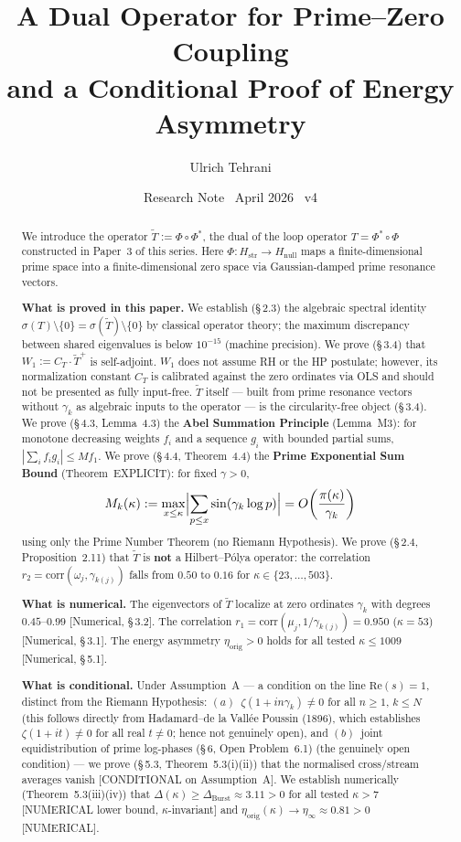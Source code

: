 \documentclass[11pt]{article}
\title{\vspace{-1.5em}\bfseries A Dual Operator for Prime--Zero Coupling\\[0.4em]
\large and a Conditional Proof of Energy Asymmetry}
\author{Ulrich Tehrani}
\date{Research Note \textperiodcentered\ April 2026 \textperiodcentered\ v4}
\newcommand{\Hstr}{H_{\mathrm{str}}}
\newcommand{\Hnull}{H_{\mathrm{null}}}
\newcommand{\etaorig}{\eta_{\mathrm{orig}}}
\newcommand{\Tt}{\widetilde{T}}
\newcommand{\CT}{C_{T}}
\newcommand{\Wone}{W_1}
\newcommand{\Dburstvar}{\Delta_{\mathrm{Burst}}}
\begin{document}
\maketitle

\begin{abstract}
We introduce the operator $\Tt := \Phi \circ \Phi^*$,
the dual of the loop operator $T = \Phi^* \circ \Phi$ constructed in Paper~3
of this series. Here $\Phi\colon\Hstr \to \Hnull$ maps a
finite-dimensional prime space into a finite-dimensional zero space via
Gaussian-damped prime resonance vectors.

\textbf{What is proved in this paper.}
We establish (\S\,2.3) the algebraic spectral identity
$\sigma(T)\setminus\{0\} = \sigma(\Tt)\setminus\{0\}$
by classical operator theory; the maximum discrepancy between shared
eigenvalues is below $10^{-15}$ (machine precision).
We prove (\S\,3.4) that $\Wone := \CT\cdot\Tt^+$ is self-adjoint.
$\Wone$ does not assume RH or the HP postulate; however, its normalization
constant $\CT$ is calibrated against the zero ordinates via OLS and should
not be presented as fully input-free.
$\Tt$ itself --- built from prime resonance vectors without $\gamma_k$ as
algebraic inputs to the operator --- is the circularity-free object (\S\,3.4).
We prove (\S\,4.3, Lemma~4.3) the \textbf{Abel Summation Principle} (Lemma~M3):
for monotone decreasing weights $f_i$ and a sequence $g_i$ with bounded
partial sums, $|\sum_i f_i g_i| \leq M f_1$.
We prove (\S\,4.4, Theorem~4.4) the \textbf{Prime Exponential Sum Bound}
(Theorem~EXPLICIT): for fixed $\gamma > 0$,
\[
M_k(\kappa) := \max_{x \leq \kappa}\Bigl|\sum_{p \leq x}\sin(\gamma_k\log p)\Bigr|
= O\!\left(\frac{\pi(\kappa)}{\gamma_k}\right)
\]
using only the Prime Number Theorem (no Riemann Hypothesis).
We prove (\S\,2.4, Proposition~2.11) that $\Tt$ is \textbf{not} a
Hilbert--P\'olya operator: the correlation
$r_2 = \mathrm{corr}(\omega_j,\gamma_{k(j)})$
falls from $0.50$ to $0.16$ for $\kappa\in\{23,\ldots,503\}$.

\textbf{What is numerical.}
The eigenvectors of $\Tt$ localize at zero ordinates $\gamma_k$
with degrees $0.45$--$0.99$ [Numerical, \S\,3.2].
The correlation $r_1 = \mathrm{corr}(\mu_j,1/\gamma_{k(j)}) = 0.950$
($\kappa=53$) [Numerical, \S\,3.1].
The energy asymmetry $\etaorig > 0$ holds for all tested $\kappa\leq 1009$
[Numerical, \S\,5.1].

\textbf{What is conditional.}
Under Assumption~A --- a condition on the line
$\mathrm{Re}(s)=1$, distinct from the Riemann Hypothesis:
$(a)$~$\zeta(1+in\gamma_k)\neq 0$ for all $n\geq 1$, $k\leq N$
(this follows directly from Hadamard--de la Vall\'ee Poussin (1896),
which establishes $\zeta(1+it)\neq 0$ for all real $t\neq 0$;
hence not genuinely open), and
$(b)$~joint equidistribution of prime log-phases (\S\,6, Open Problem~6.1)
(the genuinely open condition)
--- we prove (\S\,5.3, Theorem~5.3(i)(ii)) that the normalised cross/stream
averages vanish [CONDITIONAL on Assumption~A].
We establish numerically (Theorem~5.3(iii)(iv)) that
$\Delta(\kappa)\geq\Dburstvar\approx 3.11 > 0$ for all tested $\kappa > 7$
[NUMERICAL lower bound, $\kappa$-invariant] and
$\etaorig(\kappa)\to\eta_\infty\approx 0.81 > 0$ [NUMERICAL].


\end{abstract}
\end{document}
